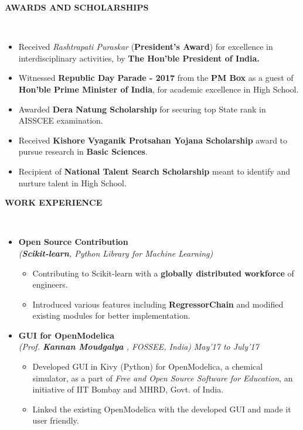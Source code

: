 \documentclass[a4paper,10pt]{article}
\newcommand{\isep}{-2 pt}
\newcommand{\lsep}{-0.5cm}
\newcommand{\blank}[1]{\hspace*{#1}}
\newcommand{\resheading}[1]{{\small \colorbox{mygrey}{\begin{minipage}{0.975\textwidth}{\textbf{#1 \vphantom{p\^{E}}}}\end{minipage}}}}
\begin{document}
\resheading{\textbf{AWARDS AND SCHOLARSHIPS} }\\[\lsep]
\begin{itemize}
\setlength\itemsep{0.05em}
\item \noindent Received \emph{Rashtrapati Puraskar} (\textbf{President's Award}) for excellence in interdisciplinary activities, by \textbf{The Hon'ble President of India.}
\item \noindent Witnessed \textbf{Republic Day Parade - 2017} from the \textbf{PM Box} as a guest of \textbf{Hon'ble Prime Minister of India}, for academic excellence in High School.
\item \noindent Awarded \textbf{Dera Natung Scholarship} for securing top State rank in AISSCEE examination.
\item \noindent Received \textbf{Kishore Vyaganik Protsahan Yojana Scholarship} award to pursue research in \textbf{Basic Sciences}.
\item \noindent Recipient of \textbf{National Talent Search Scholarship} meant to identify and nurture talent in High School.
\end{itemize}

\resheading{\textbf{WORK EXPERIENCE} }\\[\lsep]
\begin{itemize}
\item \textbf{Open Source Contribution
}  \\
 \emph{(\textbf{Scikit-learn}, Python Library for Machine Learning)} \\[-0.6cm]
	\begin{itemize}\itemsep \isep
	\item Contributing to Scikit-learn with a \textbf{globally distributed workforce} of engineers.
	\item Introduced various features including \textbf{RegressorChain} and modified existing modules for better implementation.

	\end{itemize}

\item \textbf{GUI for OpenModelica} \\
 \emph{(Prof. \textbf{Kannan Moudgalya} 
, FOSSEE, India)} \blank{7.5cm} \emph{May'17 to July'17} \\[-0.6cm]
	\begin{itemize}\itemsep \isep
	\item Developed GUI in Kivy (Python) for OpenModelica, a chemical simulator, as a part of \emph{Free and Open Source Software for Education}, an initiative of IIT Bombay and MHRD, Govt. of India.
	\item Linked the existing OpenModelica with the developed GUI and made it user friendly.
	\end{itemize}
\end{itemize}
\end{document}
